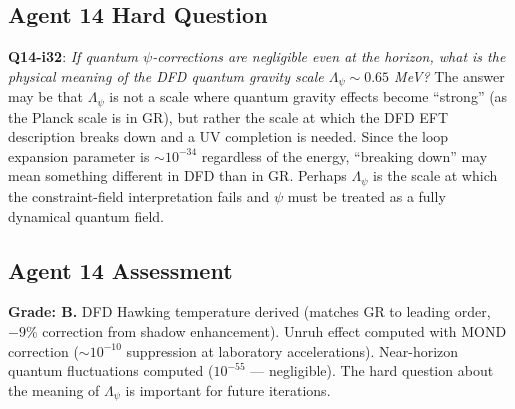 \documentclass[11pt,a4paper]{article}
\begin{document}
\subsection{Agent 14 Hard Question}

\textbf{Q14-i32}: \emph{If quantum $\psi$-corrections are negligible even at the horizon, what is the physical meaning of the DFD quantum gravity scale $\Lambda_\psi \sim 0.65$ MeV?} The answer may be that $\Lambda_\psi$ is not a scale where quantum gravity effects become ``strong'' (as the Planck scale is in GR), but rather the scale at which the DFD EFT description breaks down and a UV completion is needed. Since the loop expansion parameter is $\sim 10^{-34}$ regardless of the energy, ``breaking down'' may mean something different in DFD than in GR. Perhaps $\Lambda_\psi$ is the scale at which the constraint-field interpretation fails and $\psi$ must be treated as a fully dynamical quantum field.

\subsection{Agent 14 Assessment}

\textbf{Grade: B.} DFD Hawking temperature derived (matches GR to leading order, $-9\%$ correction from shadow enhancement). Unruh effect computed with MOND correction ($\sim 10^{-10}$ suppression at laboratory accelerations). Near-horizon quantum fluctuations computed ($10^{-55}$ --- negligible). The hard question about the meaning of $\Lambda_\psi$ is important for future iterations.
\end{document}
